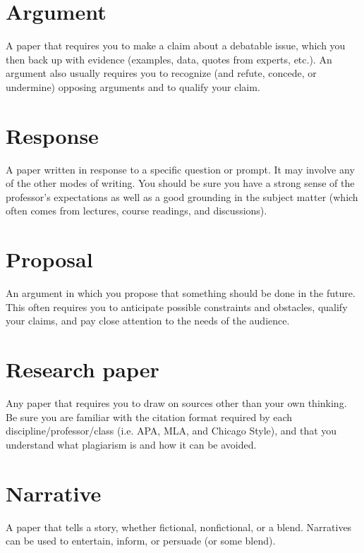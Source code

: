 \section{Argument}

A paper that requires you to make a claim about a debatable issue, which you then 
back up with evidence (examples, data, quotes from experts, etc.). An argument also 
usually requires you to recognize (and refute, concede, or undermine) opposing 
arguments and to qualify your claim.

\section{Response}

A paper written in response to a specific question or prompt. It may involve any of the 
other modes of writing. You should be sure you have a strong sense of the professor's 
expectations as well as a good grounding in the subject matter (which often comes 
from lectures, course readings, and discussions).

\section{Proposal}

An argument in which you propose that something should be done in the future. This 
often requires you to anticipate possible constraints and obstacles, qualify your claims, 
and pay close attention to the needs of the audience.

\section{Research paper}

Any paper that requires you to draw on sources other than your own thinking. Be sure 
you are familiar with the citation format required by each discipline/professor/class 
(i.e. APA, MLA, and Chicago Style), and that you understand what plagiarism is and how 
it can be avoided.

\section{Narrative}

A paper that tells a story, whether fictional, nonfictional, or a blend. Narratives can be 
used to entertain, inform, or persuade (or some blend).



